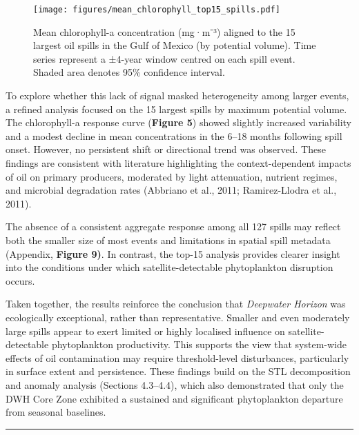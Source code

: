 \documentclass[
  11pt,
]{article}
\begin{document}
\begin{figure}[H]

{\centering \texttt{[image: figures/mean\_chlorophyll\_top15\_spills.pdf]}

}

\caption{Mean chlorophyll-a concentration (mg·m⁻³) aligned to the 15
largest oil spills in the Gulf of Mexico (by potential volume). Time
series represent a ±4-year window centred on each spill event. Shaded
area denotes 95\% confidence interval.}

\end{figure}%

To explore whether this lack of signal masked heterogeneity among larger
events, a refined analysis focused on the 15 largest spills by maximum
potential volume. The chlorophyll-a response curve (\textbf{Figure 5})
showed slightly increased variability and a modest decline in mean
concentrations in the 6--18 months following spill onset. However, no
persistent shift or directional trend was observed. These findings are
consistent with literature highlighting the context-dependent impacts of
oil on primary producers, moderated by light attenuation, nutrient
regimes, and microbial degradation rates (Abbriano et al., 2011;
Ramirez-Llodra et al., 2011).

The absence of a consistent aggregate response among all 127 spills may
reflect both the smaller size of most events and limitations in spatial
spill metadata (Appendix, \textbf{Figure 9)}. In contrast, the top-15
analysis provides clearer insight into the conditions under which
satellite-detectable phytoplankton disruption occurs.

Taken together, the results reinforce the conclusion that
\emph{Deepwater Horizon} was ecologically exceptional, rather than
representative. Smaller and even moderately large spills appear to exert
limited or highly localised influence on satellite-detectable
phytoplankton productivity. This supports the view that system-wide
effects of oil contamination may require threshold-level disturbances,
particularly in surface extent and persistence. These findings build on
the STL decomposition and anomaly analysis (Sections 4.3--4.4), which
also demonstrated that only the DWH Core Zone exhibited a sustained and
significant phytoplankton departure from seasonal baselines.

\begin{center}\rule{0.5\linewidth}{0.5pt}\end{center}
\end{document}
